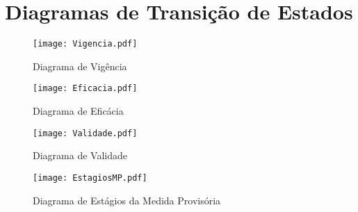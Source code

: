 \chapter{Diagramas de Transição de Estados}
\label{apendice_diagramas}


\begin{figure}[htb]
	\caption{\label{fig_grafico_vigencia}Diagrama de Vigência}
	\begin{center}
	    \texttt{[image: Vigencia.pdf]}
	\end{center}
\end{figure}

\begin{figure}[htb]
	\caption{\label{fig_grafico_eficacia}Diagrama de Eficácia}
	\begin{center}
	    \texttt{[image: Eficacia.pdf]}
	\end{center}
\end{figure}

\begin{figure}[htb]
	\caption{\label{fig_grafico_validade}Diagrama de Validade}
	\begin{center}
	    \texttt{[image: Validade.pdf]}
	\end{center}
\end{figure}

\begin{figure}[htb]
	\caption{\label{fig_grafico_estagios-mp}Diagrama de Estágios da Medida
	Provisória}
	\begin{center}
	    \texttt{[image: EstagiosMP.pdf]}
	\end{center}
\end{figure}
